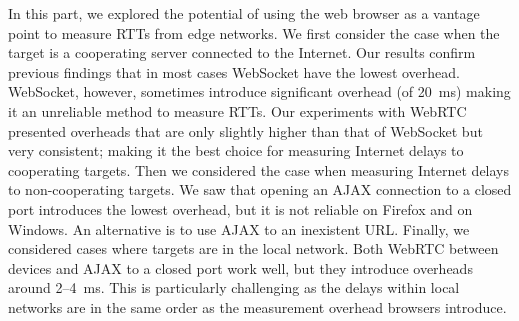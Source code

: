 \documentclass{sig-alternate-10pt}
\begin{document}

In this part, we explored the potential of using the web browser as a vantage point to measure RTTs from edge networks. 
We first consider the case when the target is a cooperating server connected to the Internet. Our results confirm previous findings that in most cases WebSocket have the lowest overhead. WebSocket, however, sometimes introduce significant overhead (of 20~ms) making it an unreliable method to measure RTTs. Our experiments with WebRTC presented overheads that are only slightly higher than that of WebSocket but very consistent; making it the best choice for measuring Internet delays to cooperating targets. Then
we considered the case when measuring Internet delays to non-cooperating targets. We saw that opening an AJAX connection to a closed port introduces the lowest overhead, but it is not reliable on Firefox and on Windows. An alternative is to use AJAX to an inexistent URL. Finally, we considered cases where targets are in the local network. Both WebRTC between devices and AJAX to a closed port work well, but they introduce overheads around 2--4~ms. This is particularly challenging as the delays within local networks are in the same order as the measurement overhead browsers introduce. 
\end{document}
